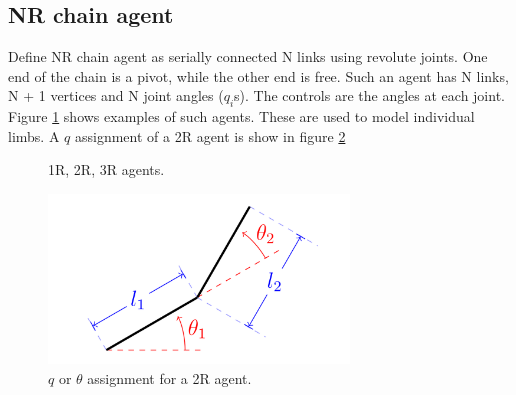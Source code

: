 \documentclass[12pt]{article}
\begin{document}
\subsection{NR chain agent}
Define NR chain agent as serially connected N links using revolute joints.
One end of the chain is a pivot, while the other end is free.
Such an agent has N links, N + 1 vertices and N joint angles ($q_i$s).
The controls are the angles at each joint.
Figure \ref{fig:1} shows examples of such agents.
These are used to model individual limbs.
A $q$ assignment of a 2R agent is show in figure \ref{fig:2R}
\begin{figure}[h!]
    \centering
    \caption{1R, 2R, 3R agents.}
    \label{fig:1}
\end{figure}
\begin{figure}[h]
    \centering
    \includegraphics[width=8cm]{figures/2R.png}
    \caption{$q$ or $\theta$ assignment for a 2R agent.}
    \label{fig:2R}
\end{figure}
\end{document}
